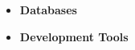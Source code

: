 \documentclass[12pt,a4paper]{altacv}
\begin{document}
\begin{paracol}{2}
\bigskip

\begin{itemize}
  \item \color{accent}\bfseries{Databases}
\end{itemize}

\bigskip

\begin{itemize}
  \item \color{accent}\bfseries{Development Tools}
\end{itemize}

\end{paracol}
\end{document}
